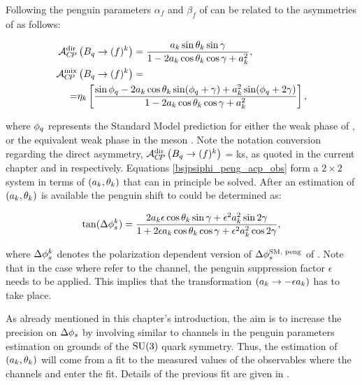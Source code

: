 Following \cite{Faller:2008gt} the penguin parameters $\alpha_f$ and $\beta_f$ of 
can be related to the \CP asymmetries of  as follows:

\begin{subequations}
  \label{bsjpsiphi_peng_acp_obs}
  \begin{align}
    \mathcal{A}_{C\!P}^{\rm dir}&\left( B_q\rightarrow (f)^k \right) = \frac{ a_k \sin\theta_k \sin\gamma} {1 - 2 a_k \cos\theta_k \cos\gamma + a_k^{2}}, \label{bsjpsiphi_peng_acp_dir} \\
    \mathcal{A}_{C\!P}^{\rm mix}&\left( B_q\rightarrow (f)^k \right) = \nonumber \\
    = & \eta_k \left[ \frac{\sin\phi_q - 2a_k \cos\theta_k\sin(\phi_q+\gamma) + a_k^2 \sin(\phi_q+2\gamma)}
                                                                 {1 - 2 a_k \cos\theta_k \cos\gamma + a_k^{2}}  \right], \label{bsjpsiphi_peng_acp_mix}
  \end{align}
\end{subequations}

\noindent where $\phi_q$ represents the Standard Model prediction for either the weak phase \phis of ,
or the equivalent weak phase \phid in the \Bd meson \cite{PDG}. Note the notation conversion regarding the direct \CP
asymmetry, $\mathcal{A}_{C\!P}^{\rm dir}\left(B_q\rightarrow (f)^k\right)$ = \Acp{k}, as quoted in the current chapter and in
 respectively. Equations \ref{bsjpsiphi_peng_acp_obs} form a $2\times2$ system in
terms of $(a_k,\theta_k)$ that can in principle be solved. After an estimation of $(a_k,\theta_k)$ is available the
penguin shift to \phis could be determined as:

\begin{equation}
\centering
\tan(\Delta\phis^k) = \frac{ 2\akPeng\epsilon\cos\thkPeng \sin\gamma + \epsilon^2\akPeng^2 \sin2\gamma}
                             {1 + 2\epsilon\akPeng \cos\thkPeng \cos\gamma + \epsilon^2\akPeng^2 \cos2\gamma},
\label{tandelta}
\end{equation}

\noindent where $\Delta\phi_{s}^k$ denotes the polarization dependent version of $\Delta\phi_{s}^{\tiny\text{SM, peng}}$ of .
Note that in the case where  refer to the \BsJpsiPhi channel, the penguin suppression factor
$\epsilon$ needs to be applied. This implies that the transformation $(a_k\rightarrow-\epsilon a_k)$ has to take place.

As already mentioned in this chapter's introduction, the aim is to increase the precision on $\Delta{\ensuremath{\phi_{s}}}$
by involving similar to \BsJpsiPhi channels in the penguin parameters estimation on grounds of the $\mathrm{SU}(3)$ quark symmetry.
Thus, the estimation of $(a_k,\theta_k)$ will come from a \chisq fit to the measured values of the observables
 where the channels \BsJpsiKst and \BdJpsiRho enter the fit.
Details of the previous fit are given in .

